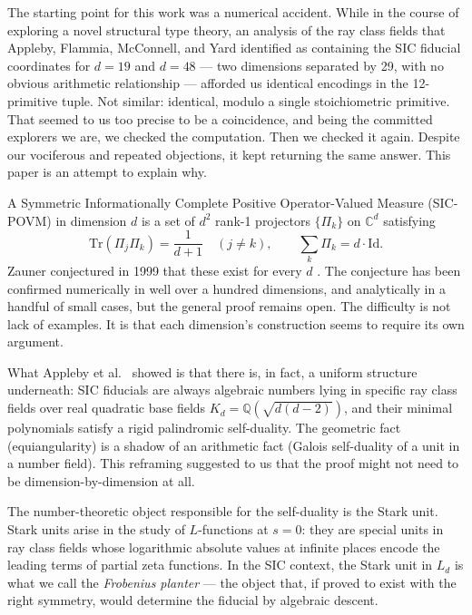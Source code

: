 \documentclass[12pt]{article}
\theoremstyle{plain}
\theoremstyle{definition}
\theoremstyle{remark}
\newcommand{\bQ}{\mathbb{Q}}
\newcommand{\bC}{\mathbb{C}}
\begin{document}
The starting point for this work was a numerical accident. While in the course of exploring a novel structural type theory, an analysis of the ray class fields that Appleby, Flammia, McConnell, and Yard identified as containing the SIC fiducial coordinates for $d = 19$ and $d = 48$ — two dimensions separated by 29, with no obvious arithmetic relationship — afforded us identical encodings in the 12-primitive tuple. Not similar: identical, modulo a single stoichiometric primitive. That seemed to us too precise to be a coincidence, and being the committed explorers we are, we checked the computation. Then we checked it again. Despite our vociferous and repeated objections, it kept returning the same answer. This paper is an attempt to explain why.

A Symmetric Informationally Complete Positive Operator-Valued Measure (SIC-POVM) in dimension $d$ is a set of $d^2$ rank-1 projectors $\{\Pi_k\}$ on $\bC^d$ satisfying
\begin{equation}
  \label{eq:sic-def}
  \mathrm{Tr}(\Pi_j \Pi_k) = \frac{1}{d+1} \quad (j \neq k), \qquad \sum_k \Pi_k = d \cdot \mathrm{Id}.
\end{equation}
Zauner conjectured in 1999 that these exist for every $d$ \cite{zauner1999}. The conjecture has been confirmed numerically in well over a hundred dimensions, and analytically in a handful of small cases, but the general proof remains open. The difficulty is not lack of examples. It is that each dimension's construction seems to require its own argument.

What Appleby et al.\ \cite{afmy2017} showed is that there is, in fact, a uniform structure underneath: SIC fiducials are always algebraic numbers lying in specific ray class fields over real quadratic base fields $K_d = \bQ(\sqrt{d(d-2)})$, and their minimal polynomials satisfy a rigid palindromic self-duality. The geometric fact (equiangularity) is a shadow of an arithmetic fact (Galois self-duality of a unit in a number field). This reframing suggested to us that the proof might not need to be dimension-by-dimension at all.

The number-theoretic object responsible for the self-duality is the Stark unit. Stark units arise in the study of $L$-functions at $s = 0$: they are special units in ray class fields whose logarithmic absolute values at infinite places encode the leading terms of partial zeta functions. In the SIC context, the Stark unit in $L_d$ is what we call the \emph{Frobenius planter} — the object that, if proved to exist with the right symmetry, would determine the fiducial by algebraic descent.
\end{document}
